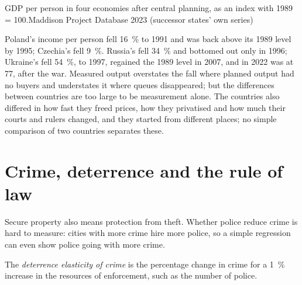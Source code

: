 \begin{omchart}{GDP per person in four economies after central planning, as an index with
1989 = 100.}{Maddison Project Database 2023 (successor states' own series)}
\end{omchart}

Poland's income per person fell 16~\% to 1991 and was back above its 1989 level by 1995; Czechia's fell
9~\%. Russia's fell 34~\% and bottomed out only in 1996; Ukraine's fell 54~\%, to 1997, regained the 1989 level
in 2007, and in 2022 was at 77, after the war. Measured output overstates the fall where
planned output had no buyers and understates it where queues disappeared; but the
differences between countries are too large to be measurement alone. The countries
also differed in how fast they freed prices, how they privatised and how much their
courts and rulers changed, and they started from different places; no simple
comparison of two countries separates these.

\section{Crime, deterrence and the rule of law}\label{sec:b3:institutions:crime}

Secure property also means protection from theft. Whether police reduce crime is
hard to measure: cities with more crime hire more police, so a simple regression
can even show police going with more crime.

\begin{definition}\label{def:b3:institutions:deterrence}
The \emph{deterrence elasticity of crime} is the percentage change in crime for a
1~\% increase in the resources of enforcement, such as the number of police.
\end{definition}


